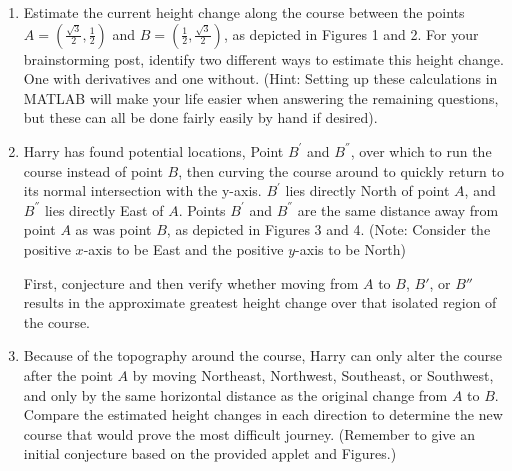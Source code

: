 \documentclass{ximera}
\begin{document}
\begin{enumerate}
\item Estimate the current height change along the course between the points $A=\left(\frac{\sqrt{3}}{2},\frac{1}{2}\right)$ and $B=\left(\frac{1}{2},\frac{\sqrt{3}}{2}\right)$, as depicted in Figures 1 and 2. For your brainstorming post, identify two different ways to estimate this height change. One with derivatives and one without. (Hint: Setting up these calculations in MATLAB will make your life easier when answering the remaining questions, but these can all be done fairly easily by hand if desired).

\item Harry has found potential locations, Point $B^{\prime}$ and $B^{''}$, over which to run the course instead of point $B$, then curving the course around to quickly return to its normal intersection with the y-axis. $B^{\prime}$ lies directly North of point $A$, and $B^{''}$ lies directly East of $A$. Points $B^{\prime}$ and $B^{''}$ are the same distance away from point $A$ as was point $B$, as depicted in Figures 3 and 4. (Note: Consider the positive $x$-axis to be East and the positive $y$-axis to be North)

First, conjecture and then verify whether moving from $A$ to $B$, $B'$, or $B''$ results in the approximate greatest height change over that isolated region of the course.

\item Because of the topography around the course, Harry can only alter the course after the point $A$ by moving Northeast, Northwest, Southeast, or Southwest, and only by the same horizontal distance as the original change from $A$ to $B$. Compare the estimated height changes in each direction to determine the new course that would prove the most difficult journey. (Remember to give an initial conjecture based on the provided applet and Figures.)
\end{enumerate}
\end{document}
